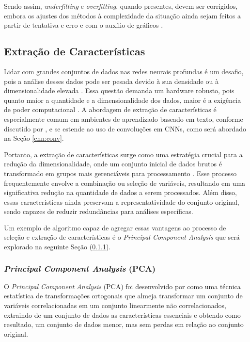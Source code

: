Sendo assim, \textit{underfitting} e \textit{overfitting}, quando presentes, devem ser corrigidos, embora os ajustes dos métodos à complexidade da situação ainda sejam feitos a partir de tentativa e erro e com o auxílio de gráficos \citep{Goodfellow2016}.

\subsection{Extração de Características}
\label{deep:feature_extraction}

Lidar com grandes conjuntos de dados nas redes neurais profundas é um desafio, pois a análise desses dados pode ser pesada devido à sua densidade ou à dimensionalidade elevada \citep{Liang2017TextReview}. Essa questão demanda um hardware robusto, pois quanto maior a quantidade e a dimensionalidade dos dados, maior é a exigência de poder computacional \citep{Benyahia2022Multi-featuresClassification}. A abordagem de extração de características é especialmente comum em ambientes de aprendizado baseado em texto, conforme discutido por \cite{Liang2017TextReview}, e se estende ao uso de convoluções em CNNs, como será abordado na Seção \ref{cnn:conv}.

Portanto, a extração de características surge como uma estratégia crucial para a redução da dimensionalidade, onde um conjunto inicial de dados brutos é transformado em grupos mais gerenciáveis para processamento \citep{Benyahia2022Multi-featuresClassification}. Esse processo frequentemente envolve a combinação ou seleção de variáveis, resultando em uma significativa redução na quantidade de dados a serem processados. Além disso, essas características ainda preservam a representatividade do conjunto original, sendo capazes de reduzir redundâncias para análises específicas.

Um exemplo de algoritmo capaz de agregar essas vantagens ao processo de seleção e extração de características é o \textit{Principal Component Analysis} que será explorado na seguinte Seção (\ref{deep:feature_extraction:pca}). 


\subsubsection{\textit{Principal Component Analysis} (PCA)}
\label{deep:feature_extraction:pca}
O \textit{Principal Component Analysis} (PCA) foi desenvolvido por \cite{Wold1987PrincipalAnalysis} como uma técnica estatística de transformações ortogonais que almeja transformar um conjunto de variáveis correlacionadas em um conjunto linearmente não correlacionados, extraindo de um conjunto de dados as características essenciais \citep{Wold1987PrincipalAnalysis} e obtendo como resultado, um conjunto de dados menor, mas sem perdas em relação ao conjunto original.

